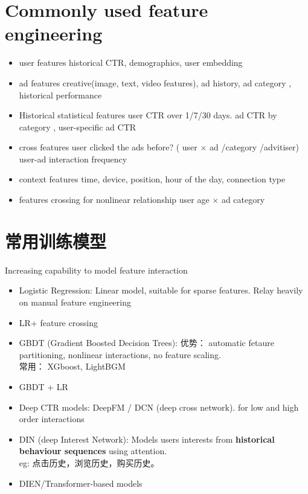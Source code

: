 \section{Commonly used feature engineering}
\begin{itemize}
    \item user features
        \subitem historical CTR, demographics, user embedding
    \item ad features
        \subitem creative(image, text, video features), ad history, ad category , historical performance
    
    \item Historical statistical features
        \subitem user CTR over 1/7/30 days.
        \subitem ad CTR by category , user-specific ad CTR
    
    \item cross features
        \subitem user clicked the ads before? ( user $\times$ ad /category /advitiser)
        \subitem user-ad interaction frequency
    \item context features
        \subitem time, device, position, hour of the day, connection type
    \item features crossing for nonlinear relationship
        \subitem user age $\times$ ad category 
\end{itemize}

    
\section{常用训练模型}
Increasing capability to model feature interaction
\begin{itemize}
    \item Logistic Regression: Linear model, suitable for sparse features. Relay heavily on manual feature engineering
    \item LR+ feature crossing
    \item GBDT (Gradient Boosted Decision Trees): 优势： automatic fetaure partitioning, nonlinear interactions, no feature scaling.\\
    常用： XGboost, LightBGM
    \item GBDT + LR

    \item Deep CTR models: DeepFM / DCN (deep cross network). for low and high order interactions
    \item DIN (deep Interest Network): Models users interests from \textbf{historical behaviour sequences} using attention.\\
    eg: 点击历史，浏览历史，购买历史。
    \item DIEN/Transformer-based models
\end{itemize}

